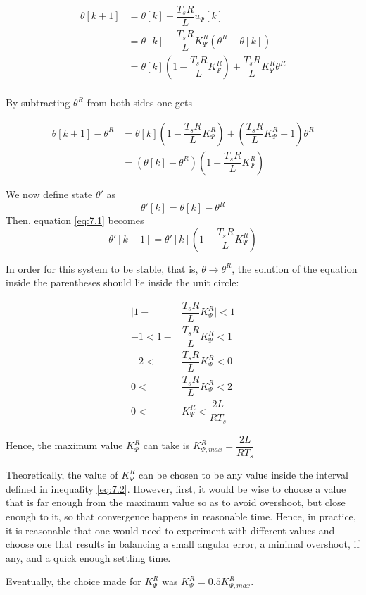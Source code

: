 \begin{align*}
  \theta[k+1] &= \theta[k] + \dfrac{T_s R}{L} u_{\Psi}[k]  \\
            ~ &= \theta[k] + \dfrac{T_s R}{L} K_{\Psi}^R (\theta^R - \theta[k]) \\
            ~ &= \theta[k](1 - \dfrac{T_s R}{L} K_{\Psi}^R) + \dfrac{T_s R}{L} K_{\Psi}^R \theta^R  \\
\end{align*}

By subtracting $\theta^R$ from both sides one gets

\begin{align}
  \theta[k+1] - \theta^R &= \theta[k](1 - \dfrac{T_s R}{L} K_{\Psi}^R) + (\dfrac{T_s R}{L} K_{\Psi}^R - 1) \theta^R \nonumber \\
                     ~ &= (\theta[k] - \theta^R)(1 - \dfrac{T_s R}{L} K_{\Psi}^R) \label{eq:7.1}
\end{align}

We now define state $\theta'$ as
$$\theta'[k] = \theta[k] - \theta^R$$
Then, equation \ref{eq:7.1} becomes
$$\theta'[k+1] = \theta'[k](1 - \dfrac{T_s R}{L} K_{\Psi}^R)$$

In order for this system to be stable, that is, $\theta \rightarrow \theta^R$,
the solution of the equation inside the parentheses should lie inside the unit
circle:

\begin{align}
  \Big|1 - &\dfrac{T_s R}{L} K_{\Psi}^R\Big| < 1 \nonumber \\
  -1 < 1 - &\dfrac{T_s R}{L} K_{\Psi}^R < 1 \nonumber \\
  -2 < - &\dfrac{T_s R}{L} K_{\Psi}^R < 0 \nonumber \\
   0 < &\dfrac{T_s R}{L} K_{\Psi}^R < 2 \nonumber \\
   0 < &K_{\Psi}^R < \dfrac{2L}{R T_s} \label{eq:7.2}
\end{align}

Hence, the maximum value $K_{\Psi}^R$ can take is $K_{\Psi,max}^R = \dfrac{2L}{R T_s}$

Theoretically, the value of $K_{\Psi}^R$ can be chosen to be any value inside
the interval defined in inequality \ref{eq:7.2}. However, first, it would be
wise to choose a value that is far enough from the maximum value so as to avoid
overshoot, but close enough to it, so that convergence happens in reasonable
time. Hence, in practice, it is reasonable that one would need to experiment
with different values and choose one that results in balancing a small angular
error, a minimal overshoot, if any, and a quick enough settling time.

Eventually, the choice made for $K_{\Psi}^R$ was $K_{\Psi}^R = 0.5K_{\Psi,max}^R$.
